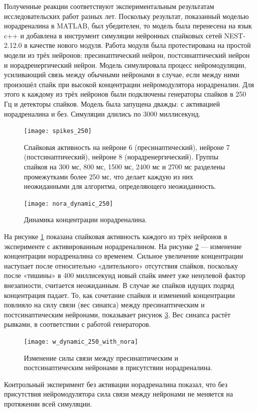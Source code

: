 Полученные реакции соответствуют экспериментальным результатам исследовательских работ разных лет.\cite{viljoen, delaneytransmission, macaca} Поскольку результат, показанный моделью норадреналина в MATLAB, был убедителен, то модель была перенесена на язык c++ и добавлена в инструмент симуляции нейронных спайковых сетей NEST-2.12.0 в качестве нового модуля. Работа модуля была протестирована на простой модели из трёх нейронов: пресинаптический нейрон, постсинаптический нейрон и норадренергический нейрон. Модель симулировала процесс нейромодуляции, усиливающий связь между обычными нейронами в случае, если между ними произошёл спайк при высокой концентрации нейромодулятора норадреналин. Для этого к каждому из трёх нейронов были подключены генераторы спайков в 250 Гц и детекторы спайков. Модель была запущена дважды: с активацией норадреналина и без. Симуляции длились по 3000 миллисекунд.


\begin{figure}
	\centering
	\texttt{[image: spikes\_250]}
	\caption{Спайковая активность на нейроне 6 (пресинаптический), нейроне 7 (постсинаптический), нейроне 8 (норадренергический). Группы спайков на 300 мс, 800 мс, 1500 мс, 2400 мс и 2700 мс разделены промежутками более 250 мс, что делает каждую из них неожиданными для алгоритма, определяющего неожиданность.}
	\label{fig:s_250}
\end{figure}

\begin{figure}
	\centering
	\texttt{[image: nora\_dynamic\_250]}
	\caption{Динамика концентрации норадреналина.}
	\label{fig:nora_dynamic_250}
\end{figure}


На рисунке \ref{fig:s_250} показана спайковая активность каждого из трёх нейронов в эксперименте с активированным норадреналином. На рисунке \ref{fig:nora_dynamic_250} — изменение концентрации норадреналина со временем. Сильное увеличение концентрации наступает после относительно «длительного» отсутствия спайков, поскольку после «тишины» в 400 миллисекунд новый спайк имеет уже ненулевой фактор внезапности, считается неожиданным. В случае же спайков идущих подряд концентрация падает. То, как сочетание спайков и изменений концентрации повлияло на силу связи (вес синапса) между пресинаптическим и постсинаптическим нейронами, показывает рисунок \ref{fig:w_250}. Вес синапса растёт рывками, в соответствии с работой генераторов.

\begin{figure}
	\centering
	\texttt{[image: w\_dynamic\_250\_with\_nora]}
	\caption{Изменение силы связи между пресинаптическим и постсинаптическим нейронами в присутствии норадреналина.}
	\label{fig:w_250}
\end{figure}

Контрольный эксперимент без активации норадреналина показал, что без присутствия нейромодулятора сила связи между нейронами не меняется на протяжении всей симуляции.